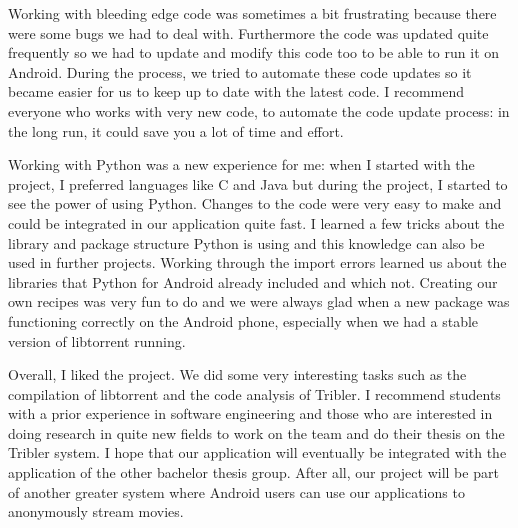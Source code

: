 			Working with bleeding edge code was sometimes a bit frustrating because there were some bugs we had to deal with. Furthermore the code was updated quite frequently so we had to update and modify this code too to be able to run it on Android. During the process, we tried to automate these code updates so it became easier for us to keep up to date with the latest code. I recommend everyone who works with very new code, to automate the code update process: in the long run, it could save you a lot of time and effort.
		
	  		Working with Python was a new experience for me: when I started with the project, I preferred languages like C and Java but during the project, I started to see the power of using Python. Changes to the code were very easy to make and could be integrated in our application quite fast. I learned a few tricks about the library and package structure Python is using and this knowledge can also be used in further projects. Working through the import errors learned us about the libraries that Python for Android already included and which not. Creating our own recipes was very fun to do and we were always glad when a new package was functioning correctly on the Android phone, especially when we had a stable version of libtorrent running.
	 	
	 		Overall, I liked the project. We did some very interesting tasks such as the compilation of libtorrent and the code analysis of Tribler. I recommend students with a prior experience in software engineering and those who are interested in doing research in quite new fields to work on the team and do their thesis on the Tribler system. I hope that our application will eventually be integrated with the application of the other bachelor thesis group. After all, our project will be part of another greater system where Android users can use our applications to anonymously stream movies.
